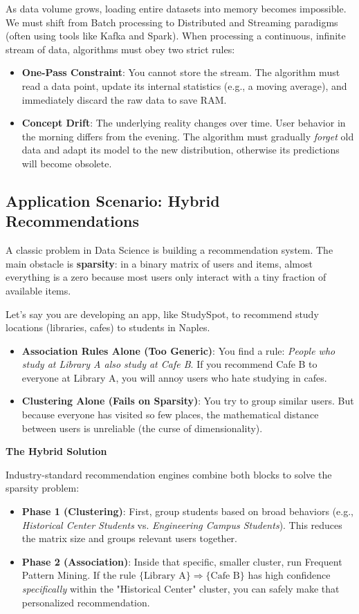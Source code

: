\documentclass[11pt]{article}
\theoremstyle{smallexample}
\begin{document}
As data volume grows, loading entire datasets into memory becomes impossible. We must shift from Batch processing to Distributed and Streaming paradigms (often using tools like Kafka and Spark). When processing a continuous, infinite stream of data, algorithms must obey two strict rules:
    \begin{itemize}
        \item \textbf{One-Pass Constraint}: You cannot store the stream. The algorithm must read a data point, update its internal statistics (e.g., a moving average), and immediately discard the raw data to save RAM.
        \item \textbf{Concept Drift}: The underlying reality changes over time. User behavior in the morning differs from the evening. The algorithm must gradually \textit{forget} old data and adapt its model to the new distribution, otherwise its predictions will become obsolete.
    \end{itemize}


\subsection{Application Scenario: Hybrid Recommendations}

A classic problem in Data Science is building a recommendation system. The main obstacle is \textbf{sparsity}: in a binary matrix of users and items, almost everything is a zero because most users only interact with a tiny fraction of available items.

Let's say you are developing an app, like StudySpot, to recommend study locations (libraries, cafes) to students in Naples.
\begin{itemize}
    \item \textbf{Association Rules Alone (Too Generic)}: You find a rule: \textit{People who study at Library A also study at Cafe B}. If you recommend Cafe B to everyone at Library A, you will annoy users who hate studying in cafes. 
    \item \textbf{Clustering Alone (Fails on Sparsity)}: You try to group similar users. But because everyone has visited so few places, the mathematical distance between users is unreliable (the curse of dimensionality).
\end{itemize}

\vspace{0.3cm}
\textbf{The Hybrid Solution}

    Industry-standard recommendation engines combine both blocks to solve the sparsity problem:
    \begin{itemize}
        \item \textbf{Phase 1 (Clustering)}: First, group students based on broad behaviors (e.g., \textit{Historical Center Students} vs. \textit{Engineering Campus Students}). This reduces the matrix size and groups relevant users together.
        \item \textbf{Phase 2 (Association)}: Inside that specific, smaller cluster, run Frequent Pattern Mining. If the rule $\{\text{Library A}\} \Rightarrow \{\text{Cafe B}\}$ has high confidence \textit{specifically} within the "Historical Center" cluster, you can safely make that personalized recommendation.
    \end{itemize}
\end{document}
